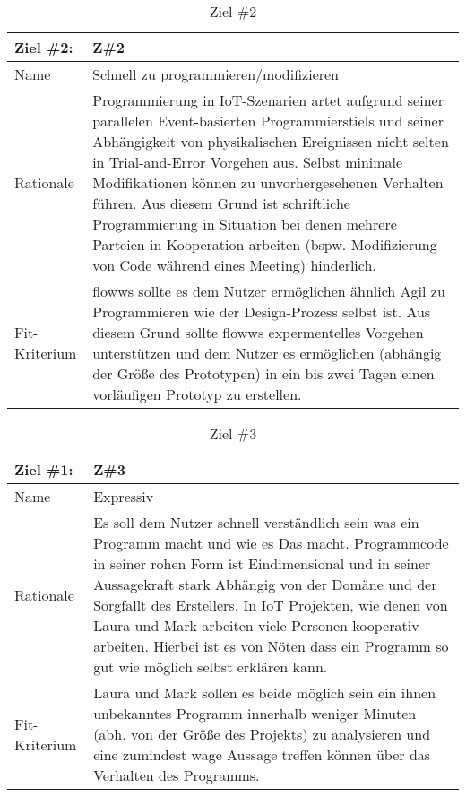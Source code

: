 \begin{table}[H]
\caption{Ziel \#2}
\label{tab:ziel2}
\begin{tabularx}{\textwidth}{lX}
\hline
\rowcolor[HTML]{EFEFEF} 
Ziel \#2:     & Z\#2 \\ \hline
Name          & Schnell zu programmieren/modifizieren\\ \hline
Rationale     & Programmierung in IoT-Szenarien artet aufgrund seiner parallelen Event-basierten Programmierstiels und seiner Abhängigkeit von physikalischen Ereignissen nicht selten in Trial-and-Error Vorgehen aus. Selbst minimale Modifikationen können zu unvorhergesehenen Verhalten führen. Aus diesem Grund ist schriftliche Programmierung in Situation bei denen mehrere Parteien in Kooperation arbeiten (bspw. Modifizierung von Code während eines Meeting) hinderlich. \\ \hline
Fit-Kriterium & flowws sollte es dem Nutzer ermöglichen ähnlich Agil zu Programmieren wie der Design-Prozess selbst ist. Aus diesem Grund sollte flowws expermentelles Vorgehen unterstützen und dem Nutzer es ermöglichen (abhängig der Größe des Prototypen)  in ein bis zwei Tagen einen vorläufigen Prototyp zu erstellen. \\ \hline
\end{tabularx}
\end{table}

\begin{table}[H]
\caption{Ziel \#3}
\label{tab:ziel3}
\begin{tabularx}{\textwidth}{lX}
\hline
\rowcolor[HTML]{EFEFEF} 
Ziel \#1:     & Z\#3 \\ \hline
Name          & Expressiv \\ \hline
Rationale     & Es soll dem Nutzer schnell verständlich sein was ein Programm macht und wie es Das macht. Programmcode in seiner rohen Form ist Eindimensional und in seiner Aussagekraft stark Abhängig von der Domäne und der Sorgfallt des Erstellers. In IoT Projekten, wie denen von Laura und Mark arbeiten viele Personen kooperativ arbeiten. Hierbei ist es von Nöten dass ein Programm so gut wie möglich selbst erklären kann. \\ \hline
Fit-Kriterium & Laura und Mark sollen es beide möglich sein ein ihnen unbekanntes Programm innerhalb weniger Minuten (abh. von der Größe des Projekts) zu analysieren und eine zumindest wage Aussage treffen können über das Verhalten des Programms. \\ \hline
\end{tabularx}
\end{table}

